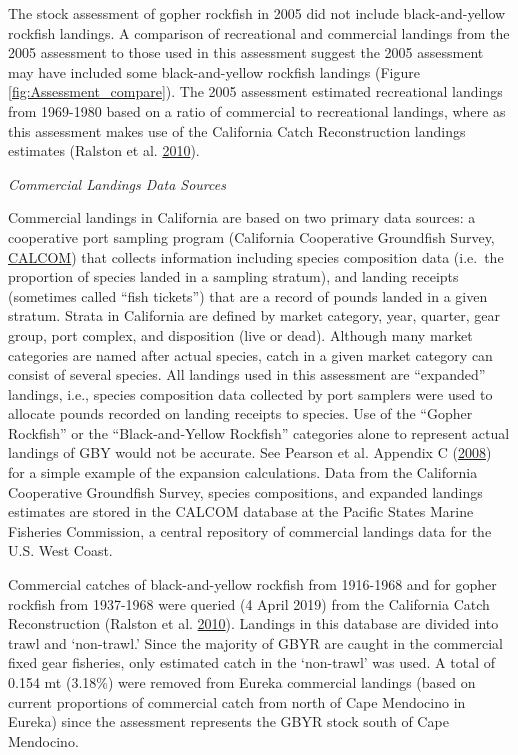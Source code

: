 \documentclass[12pt,]{article}
\begin{document}
The stock assessment of gopher rockfish in 2005 did not include
black-and-yellow rockfish landings. A comparison of recreational and
commercial landings from the 2005 assessment to those used in this
assessment suggest the 2005 assessment may have included some
black-and-yellow rockfish landings (Figure
\ref{fig:Assessment_compare}). The 2005 assessment estimated
recreational landings from 1969-1980 based on a ratio of commercial to
recreational landings, where as this assessment makes use of the
California Catch Reconstruction landings estimates (Ralston et al.
\protect\hyperlink{ref-Ralston2010}{2010}).

\emph{Commercial Landings Data Sources}

Commercial landings in California are based on two primary data sources:
a cooperative port sampling program (California Cooperative Groundfish
Survey, \href{https://calcom.psmfc.org/}{CALCOM}) that collects
information including species composition data (i.e.~the proportion of
species landed in a sampling stratum), and landing receipts (sometimes
called ``fish tickets'') that are a record of pounds landed in a given
stratum. Strata in California are defined by market category, year,
quarter, gear group, port complex, and disposition (live or dead).
Although many market categories are named after actual species, catch in
a given market category can consist of several species. All landings
used in this assessment are ``expanded'' landings, i.e., species
composition data collected by port samplers were used to allocate pounds
recorded on landing receipts to species. Use of the ``Gopher Rockfish''
or the ``Black-and-Yellow Rockfish'' categories alone to represent
actual landings of GBY would not be accurate. See Pearson et al.
Appendix C (\protect\hyperlink{ref-Pearson2008}{2008}) for a simple
example of the expansion calculations. Data from the California
Cooperative Groundfish Survey, species compositions, and expanded
landings estimates are stored in the CALCOM database at the Pacific
States Marine Fisheries Commission, a central repository of commercial
landings data for the U.S. West Coast.

Commercial catches of black-and-yellow rockfish from 1916-1968 and for
gopher rockfish from 1937-1968 were queried (4 April 2019) from the
California Catch Reconstruction (Ralston et al.
\protect\hyperlink{ref-Ralston2010}{2010}). Landings in this database
are divided into trawl and `non-trawl.' Since the majority of GBYR are
caught in the commercial fixed gear fisheries, only estimated catch in
the `non-trawl' was used. A total of 0.154 mt (3.18\%) were removed from
Eureka commercial landings (based on current proportions of commercial
catch from north of Cape Mendocino in Eureka) since the assessment
represents the GBYR stock south of Cape Mendocino.
\end{document}
